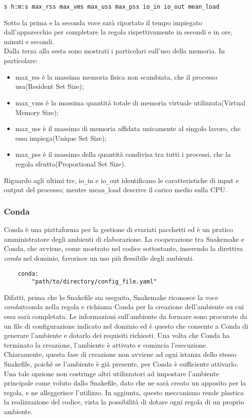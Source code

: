 \begin{lstlisting}
s h:m:s max_rss max_vms max_uss max_pss io_in io_out mean_load
\end{lstlisting}
Sotto la prima e la seconda voce sarà riportato il tempo impiegato dall'apparecchio per completare la regola rispettivamente in secondi e in ore, minuti e secondi. \\
Dalla terza alla sesta sono mostrati i particolari sull'uso della memoria. In particolare:
\begin{itemize}
\item max\verb!_!rss è la massima memoria fisica non scambiata, che il processo usa(Resident Set Size);
\item max\verb!_!vms è la massima quantità totale di memoria virtuale utilizzata(Virtual Memory Size);
\item max\verb!_!uss è il massimo di memoria affidata unicamente al singolo lavoro, che esso impiega(Unique Set Size);
\item max\verb!_!pss è il massimo della quantità condivisa tra tutti i processi, che la regola sfrutta(Proportional Set Size).   
\end{itemize}
Riguardo agli ultimi tre, io\verb!_!in e io\verb!_!out identificano le caratteristiche di input e output del processo; mentre mean\verb!_!load descrive il carico medio sulla CPU. 

\subsubsection{Conda}
Conda è una piattaforma per la gestione di svariati pacchetti ed è un pratico amministratore degli ambienti di elaborazione. La cooperazione tra Snakemake e Conda, che avviene, come mostrato nel codice sottostante, inserendo la direttiva \textit{conda} nel dominio, favorisce un uso più flessibile degli ambienti.
\begin{lstlisting}
	conda:
		"path/to/directory/config_file.yaml"
\end{lstlisting} 
Difatti, prima che lo Snakefile sia eseguito, Snakemake riconosce la voce \textit{conda}it{conda} nella regola e richiama Conda per la creazione dell'ambiente su cui essa sarà completata. Le informazioni sull'ambiente da formare sono procurate da un file di configurazione indicato nel dominio ed è questo che consente a Conda di generare l'ambiente e dotarlo dei requisiti richiesti. Una volta che Conda ha terminato la creazione, l'ambiente è attivato e comincia l'esecuzione. Chiaramente, questa fase di creazione non avviene ad ogni istanza dello stesso Snakefile, poichè se l'ambiente è già presente, per Conda è sufficiente attivarlo.\\
Una tale opzione non costringe altri utilizzatori ad impostare l'ambiente principale come voluto dallo Snakefile, dato che ne sarà creato un apposito per la regola, e ne alleggerisce l'utilizzo. In aggiunta, questo meccanismo rende plastica la realizzazione del codice, vista la possibilità di dotare ogni regola di un proprio ambiente.\\  

